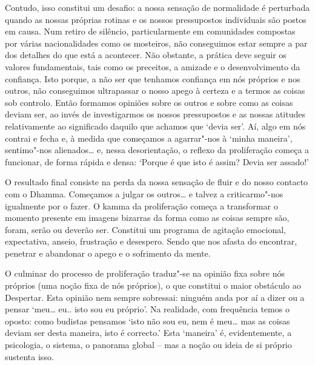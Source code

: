 Contudo, isso constitui um desafio: a nossa sensação de normalidade é perturbada
quando as nossas próprias rotinas e os nossos pressupostos individuais são
postos em causa. Num retiro de silêncio, particularmente em comunidades
compostas por várias nacionalidades como os mosteiros, não conseguimos estar
sempre a par dos detalhes do que está a acontecer. Não obstante, a prática deve
seguir os valores fundamentais, tais como os preceitos, a amizade e o
desenvolvimento da confiança. Isto porque, a não ser que tenhamos confiança em
nós próprios e nos outros, não conseguimos ultrapassar o nosso apego à certeza e
a termos as coisas sob controlo. Então formamos opiniões sobre os outros e sobre
como as coisas deviam ser, ao invés de investigarmos os nossos pressupostos e as
nossas atitudes relativamente ao significado daquilo que achamos que `devia
ser'. Aí, algo em nós contrai e fecha e, à medida que começamos a agarrar"-nos à
`minha maneira', sentimo"-nos alienados\ldots{} e, nessa desorientação, o
reflexo da proliferação começa a funcionar, de forma rápida e densa: `Porque é
que isto é assim? Devia ser assado!' 

O resultado final consiste na perda da
nossa sensação de fluir e do nosso contacto com o Dhamma. Começamos a julgar os
outros\ldots{} e talvez a criticarmo"-nos igualmente por o fazer. O kamma da
proliferação começa a transformar o momento presente em imagens bizarras da
forma como as coisas sempre são, foram, serão ou deverão ser. Constitui um
programa de agitação emocional, expectativa, anseio, frustração e desespero.
Sendo que nos afasta do encontrar, penetrar e abandonar o apego e o sofrimento
da mente.

O culminar do processo de proliferação traduz"-se na opinião fixa sobre nós
próprios (uma noção fixa de nós próprios), o que constitui o maior obstáculo ao
Despertar. Esta opinião nem sempre sobressai: ninguém anda por aí a dizer ou a
pensar `meu\ldots{} eu.. isto sou eu próprio'. Na realidade, com frequência
temos o oposto: como budistas pensamos `isto não sou eu, nem é meu\ldots{} mas
as coisas deviam ser desta maneira, isto é correcto.' Esta `maneira' é,
evidentemente, a psicologia, o sistema, o panorama global -- mas a noção ou
ideia de si próprio sustenta isso. 

